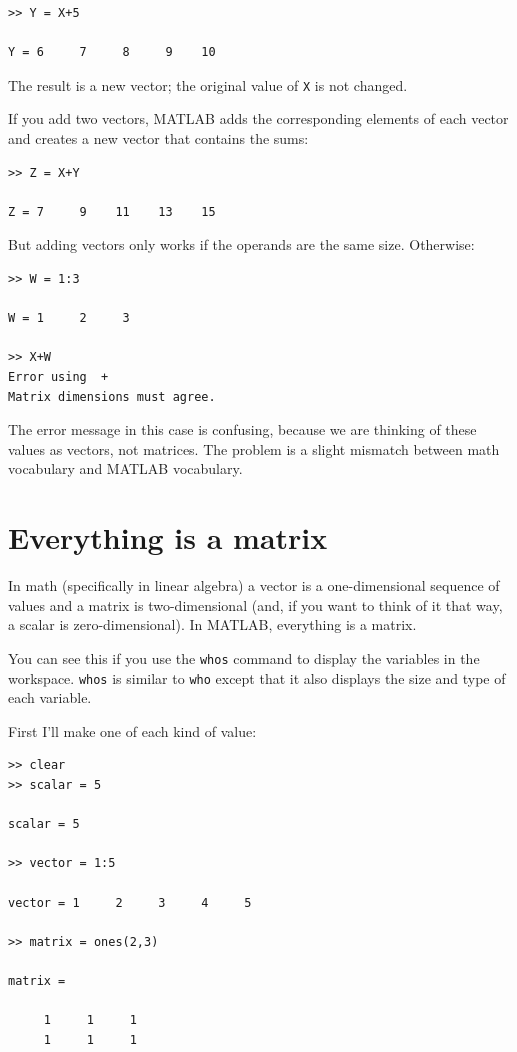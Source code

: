 \documentclass{book}
\begin{document}
\begin{verbatim}
>> Y = X+5

Y = 6     7     8     9    10
\end{verbatim}

The result is a new vector; the original value of {\tt X} is not
changed.

If you add two vectors, MATLAB adds the corresponding elements of each
vector and creates a new vector that contains the sums:

\begin{verbatim}
>> Z = X+Y

Z = 7     9    11    13    15
\end{verbatim}

But adding vectors only works if the operands are the same size.
Otherwise:

\begin{verbatim}
>> W = 1:3

W = 1     2     3

>> X+W
Error using  +
Matrix dimensions must agree.
\end{verbatim}

The error message in this case is confusing, because we are thinking
of these values as vectors, not matrices.  The problem is a slight
mismatch between math vocabulary and MATLAB vocabulary.


\section{Everything is a matrix}

In math (specifically in linear algebra) a vector is a one-dimensional
sequence of values and a matrix is two-dimensional (and, if you want
to think of it that way, a scalar is zero-dimensional).  In MATLAB,
everything is a matrix.

You can see this if you use the {\tt whos} command to display the
variables in the workspace.  {\tt whos} is similar to {\tt who} except
that it also displays the size and type of each variable.

First I'll make one of each kind of value:

\begin{verbatim}
>> clear
>> scalar = 5

scalar = 5

>> vector = 1:5

vector = 1     2     3     4     5

>> matrix = ones(2,3)

matrix =

     1     1     1
     1     1     1
\end{verbatim}
\end{document}
